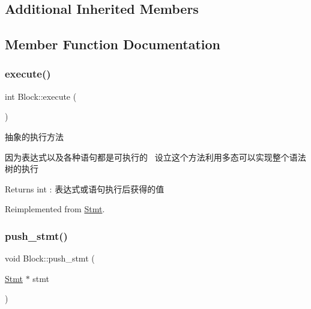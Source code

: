 \subsection*{Additional Inherited Members}


\subsection{Member Function Documentation}
\mbox{\label{class_block_a8e03f15df4e43cd6c802341c3bda6b33}} 
\subsubsection{\texorpdfstring{execute()}{execute()}}
{\footnotesize\ttfamily int Block\+::execute (\begin{DoxyParamCaption}{ }\end{DoxyParamCaption})\hspace{0.3cm}{\ttfamily [virtual]}}



抽象的执行方法 

因为表达式以及各种语句都是可执行的~\newline
设立这个方法利用多态可以实现整个语法树的执行~\newline
 \begin{DoxyReturn}{Returns}
int \+: 表达式或语句执行后获得的值 
\end{DoxyReturn}


Reimplemented from \hyperlink{class_stmt_abdc3261770c3c5bd3ce5b3ba6eedfaa4}{Stmt}.

\mbox{\label{class_block_acd012454c035cc7e0d508365752221ff}} 
\subsubsection{\texorpdfstring{push\+\_\+stmt()}{push\_stmt()}}
{\footnotesize\ttfamily void Block\+::push\+\_\+stmt (\begin{DoxyParamCaption}\item[{\hyperlink{class_stmt}{Stmt} $\ast$}]{stmt }\end{DoxyParamCaption})}

\mbox{\label{class_block_aa48058bd426766898bf31df828b3dac2}} 
